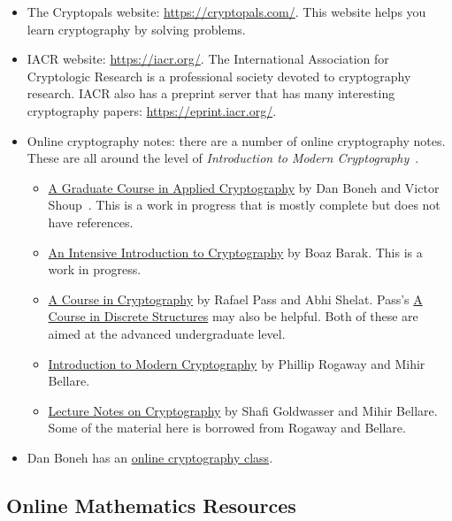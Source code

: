 \begin{itemize}
\item The Cryptopals website: \url{https://cryptopals.com/}.
    This website helps you learn cryptography by solving problems.
\item IACR website: \url{https://iacr.org/}.
    The International Association for Cryptologic Research
    is a professional society devoted to cryptography research.
    IACR also has a preprint server that has many interesting
    cryptography papers: \url{https://eprint.iacr.org/}.
\item Online cryptography notes:
    there are a number of online cryptography notes.
    These are all around the level of
    \emph{Introduction to Modern Cryptography}~\cite{IntroModernCrypto}.

    \begin{itemize}
    \item \href{https://toc.cryptobook.us/}{A Graduate Course
            in Applied Cryptography}
        by Dan Boneh and Victor Shoup~\cite{BonehShoupGraduateApplied}.
        This is a work in progress that is mostly complete
        but does not have references.
    \item \href{https://intensecrypto.org/public/}{An Intensive Introduction
        to Cryptography} by Boaz Barak.
        This is a work in progress.
    \item \href{https://www.cs.cornell.edu/courses/cs4830/2010fa/lecnotes.pdf}{A
        Course in Cryptography} by Rafael Pass and Abhi Shelat.
        Pass's \href{https://www.cs.cornell.edu/~rafael/discmath.pdf}{A
            Course in Discrete Structures} may also be helpful.
        Both of these are aimed at the advanced undergraduate level.
    \item \href{https://www.cs.ucdavis.edu/~rogaway/classes/227/spring05/book/main.pdf}{Introduction to Modern Cryptography}
        by Phillip Rogaway and Mihir Bellare.
    \item \href{https://cseweb.ucsd.edu/~mihir/papers/gb.pdf}{Lecture
        Notes on Cryptography} by Shafi Goldwasser and Mihir Bellare.
        Some of the material here is borrowed from Rogaway and Bellare.
    \end{itemize}
\item Dan Boneh has an \href{https://www.coursera.org/learn/crypto}{online
        cryptography class}.
\end{itemize}

\subsection{Online Mathematics Resources}
\label{sec:conclusion_online_math}

